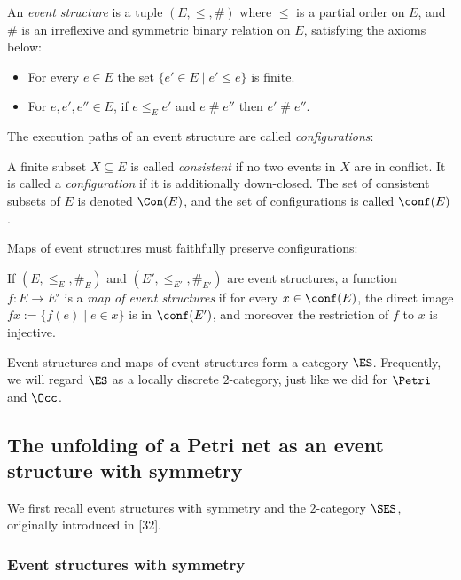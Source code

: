 \begin{definition}
An \emph{event structure} is a tuple $(E, {\leq}, \#)$ where $\leq$ is a partial order on $E$, and $\#$  is an irreflexive and symmetric binary relation on $E$, satisfying the axioms below:
\begin{itemize}
    \item For every $e \in E$  the set $\{e' \in E \mid e' \leq e \}$ is finite.
    \item For $e, e', e'' \in E$, if $e \leq_{E} e'$ and $e \mathrel{\#} e''$ then $e' \mathrel{\#} e''$.
\end{itemize}
\end{definition}
The execution paths of an event structure are called \emph{configurations}:
\begin{definition}
    A finite subset $X \subseteq E$ is called \emph{consistent} if no two events in $X$ are in conflict. It is called a \emph{configuration} if it is additionally down-closed. The set of consistent subsets of $E$ is denoted $\Con(E)$, and the set of configurations is called $\conf(E)$.
\end{definition}
Maps of event structures must faithfully preserve configurations:
\begin{definition}
    If $(E, \leq_E, \#_E)$ and $(E', \leq_{E'}, \#_{E'})$ are event structures, a function $f: E \rightarrow E'$ is a \emph{map of event structures} if for every $x \in \conf(E)$, the direct image $fx := \{f(e) \mid e \in x\}$ is in $\conf(E')$, and moreover the restriction of $f$ to $x$ is injective.
\end{definition}
Event structures and maps of event structures form a category $\ES$. Frequently, we will regard $\ES$ as a locally discrete $2$-category, just like we did for $\Petri$ and $\Occ$.

\subsection{The unfolding of a Petri net as an event structure with symmetry}

We first recall event structures with symmetry and the $2$-category $\SES$, originally introduced in [32].

\subsubsection{Event structures with symmetry}


